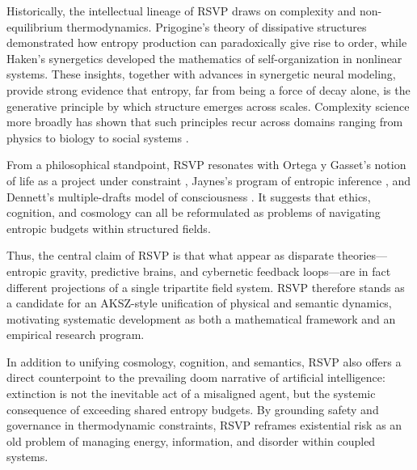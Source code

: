 \documentclass[12pt]{article}
\begin{document}
Historically, the intellectual lineage of RSVP draws on complexity and non-equilibrium thermodynamics. Prigogine’s theory of dissipative structures \cite{Prigogine1980} demonstrated how entropy production can paradoxically give rise to order, while Haken’s synergetics \cite{Haken1983} developed the mathematics of self-organization in nonlinear systems. These insights, together with advances in synergetic neural modeling, provide strong evidence that entropy, far from being a force of decay alone, is the generative principle by which structure emerges across scales. Complexity science more broadly has shown that such principles recur across domains ranging from physics to biology to social systems \cite{Smolin2019,Levin2022}.  

From a philosophical standpoint, RSVP resonates with Ortega y Gasset’s notion of life as a project under constraint \cite{Ortega1930}, Jaynes’s program of entropic inference \cite{Jaynes2003}, and Dennett’s multiple-drafts model of consciousness \cite{Dennett1991}. It suggests that ethics, cognition, and cosmology can all be reformulated as problems of navigating entropic budgets within structured fields.  

Thus, the central claim of RSVP is that what appear as disparate theories---entropic gravity, predictive brains, and cybernetic feedback loops---are in fact different projections of a single tripartite field system. RSVP therefore stands as a candidate for an AKSZ-style unification of physical and semantic dynamics, motivating systematic development as both a mathematical framework and an empirical research program.

In addition to unifying cosmology, cognition, and semantics, RSVP also offers a direct counterpoint to the prevailing doom narrative of artificial intelligence: extinction is not the inevitable act of a misaligned agent, but the systemic consequence of exceeding shared entropy budgets. 
By grounding safety and governance in thermodynamic constraints, RSVP reframes existential risk as an old problem of managing energy, information, and disorder within coupled systems.





\newpage


\end{document}
